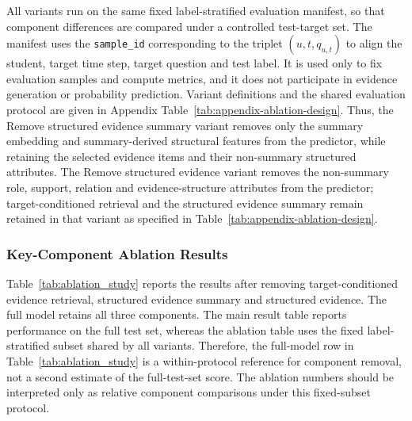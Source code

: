 \documentclass[a4paper,12pt]{article}
\numberwithin{table}{section}
\begin{document}
All variants run on the same fixed label-stratified evaluation manifest, so that component differences are compared under a controlled test-target set. The manifest uses the \texttt{sample\_id} corresponding to the triplet \((u,t,q_{u,t})\) to align the student, target time step, target question and test label. It is used only to fix evaluation samples and compute metrics, and it does not participate in evidence generation or probability prediction. Variant definitions and the shared evaluation protocol are given in Appendix Table~\ref{tab:appendix-ablation-design}. Thus, the Remove structured evidence summary variant removes only the summary embedding and summary-derived structural features from the predictor, while retaining the selected evidence items and their non-summary structured attributes. The Remove structured evidence variant removes the non-summary role, support, relation and evidence-structure attributes from the predictor; target-conditioned retrieval and the structured evidence summary remain retained in that variant as specified in Table~\ref{tab:appendix-ablation-design}.

\subsubsection{Key-Component Ablation Results}

Table~\ref{tab:ablation_study} reports the results after removing target-conditioned evidence retrieval, structured evidence summary and structured evidence. The full model retains all three components. The main result table reports performance on the full test set, whereas the ablation table uses the fixed label-stratified subset shared by all variants. Therefore, the full-model row in Table~\ref{tab:ablation_study} is a within-protocol reference for component removal, not a second estimate of the full-test-set score. The ablation numbers should be interpreted only as relative component comparisons under this fixed-subset protocol.
\end{document}
